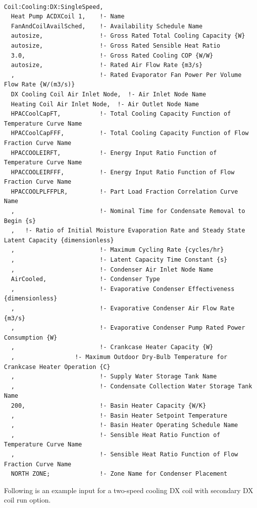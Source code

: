\begin{lstlisting}

Coil:Cooling:DX:SingleSpeed,
  Heat Pump ACDXCoil 1,    !- Name
  FanAndCoilAvailSched,    !- Availability Schedule Name
  autosize,                !- Gross Rated Total Cooling Capacity {W}
  autosize,                !- Gross Rated Sensible Heat Ratio
  3.0,                     !- Gross Rated Cooling COP {W/W}
  autosize,                !- Rated Air Flow Rate {m3/s}
  ,                        !- Rated Evaporator Fan Power Per Volume Flow Rate {W/(m3/s)}
  DX Cooling Coil Air Inlet Node,  !- Air Inlet Node Name
  Heating Coil Air Inlet Node,  !- Air Outlet Node Name
  HPACCoolCapFT,           !- Total Cooling Capacity Function of Temperature Curve Name
  HPACCoolCapFFF,          !- Total Cooling Capacity Function of Flow Fraction Curve Name
  HPACCOOLEIRFT,           !- Energy Input Ratio Function of Temperature Curve Name
  HPACCOOLEIRFFF,          !- Energy Input Ratio Function of Flow Fraction Curve Name
  HPACCOOLPLFFPLR,         !- Part Load Fraction Correlation Curve Name
  ,                        !- Nominal Time for Condensate Removal to Begin {s}
  ,   !- Ratio of Initial Moisture Evaporation Rate and Steady State Latent Capacity {dimensionless}
  ,                        !- Maximum Cycling Rate {cycles/hr}
  ,                        !- Latent Capacity Time Constant {s}
  ,                        !- Condenser Air Inlet Node Name
  AirCooled,               !- Condenser Type
  ,                        !- Evaporative Condenser Effectiveness {dimensionless}
  ,                        !- Evaporative Condenser Air Flow Rate {m3/s}
  ,                        !- Evaporative Condenser Pump Rated Power Consumption {W}
  ,                        !- Crankcase Heater Capacity {W}
  ,                 !- Maximum Outdoor Dry-Bulb Temperature for Crankcase Heater Operation {C}
  ,                        !- Supply Water Storage Tank Name
  ,                        !- Condensate Collection Water Storage Tank Name
  200,                     !- Basin Heater Capacity {W/K}
  ,                        !- Basin Heater Setpoint Temperature
  ,                        !- Basin Heater Operating Schedule Name
  ,                        !- Sensible Heat Ratio Function of Temperature Curve Name
  ,                        !- Sensible Heat Ratio Function of Flow Fraction Curve Name
  NORTH ZONE;              !- Zone Name for Condenser Placement
\end{lstlisting}

Following is an example input for a two-speed cooling DX coil with secondary DX coil run option.

